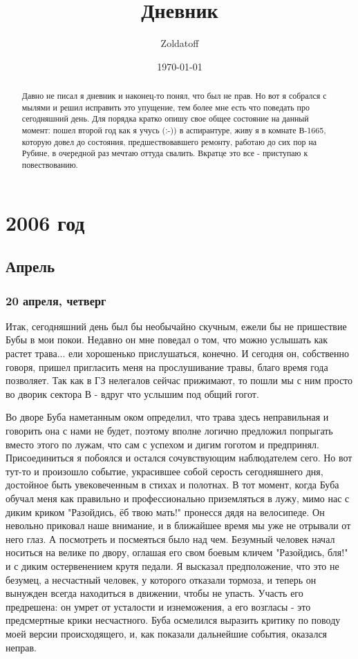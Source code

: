 \documentclass[12pt,a4paper]{article}
\newcommand{\ssubsection}[1]{
	\subsubsection*{#1}
	\addcontentsline{toc}{subsubsection}{#1}
}
\begin{document}
\author{Zoldatoff}
\title{Дневник}
\date{\today}
\maketitle
\tableofcontents
\begin{abstract}
Давно не писал я дневник и наконец-то понял, что был не прав. Но вот я собрался с мылями и решил исправить это упущение, тем более мне есть что поведать про сегодняшний день. Для порядка кратко опишу свое общее состояние на данный момент: пошел второй год как я учусь (:-)) в аспирантуре, живу я в комнате В-1665, которую довел до состояния, предшествовавшего ремонту, работаю до сих пор на Рубине, в очередной раз мечтаю оттуда свалить. Вкратце это все - приступаю к повествованию.
\end{abstract}

\section*{2006 год}

\subsection*{Апрель}

\ssubsection{20 апреля, четверг}
Итак, сегодняшний день был бы необычайно скучным, ежели бы не пришествие Бубы в мои покои. Недавно он мне поведал о том, что можно услышать как растет трава... ели хорошенько прислушаться, конечно. И сегодня он, собственно говоря, пришел пригласить меня на прослушивание травы, благо время года позволяет. Так как в ГЗ нелегалов сейчас прижимают, то пошли мы с ним просто во дворик сектора В - вдруг что услышим под общий гогот.

Во дворе Буба наметанным оком определил, что трава здесь неправильная и говорить она с нами не будет, поэтому вполне логично предложил попрыгать вместо этого по лужам, что сам с успехом и дигим гоготом и предпринял. Присоединиться я побоялся и остался сочувствующим наблюдателем сего. Но вот тут-то и произошло событие, украсившее собой серость сегодняшнего дня, достойное быть увековеченным в стихах и полотнах. В тот момент, когда Буба обучал меня как правильно и профессионально приземляться в лужу, мимо нас с диким криком "Разойдись, ёб твою мать!" пронесся дядя на велосипеде. Он невольно приковал наше внимание, и в ближайшее время мы уже не отрывали от него глаз. А посмотреть и посмеяться было над чем. Безумный человек начал носиться на велике по двору, оглашая его свом боевым кличем "Разойдись, бля!" и с диким остервенением крутя педали. Я высказал предположение, что это не безумец, а несчастный человек, у которого отказали тормоза, и теперь он вынужден всегда находиться в движении, чтобы не упасть. Участь его предрешена: он умрет от усталости и изнеможения, а его возгласы - это предсмертные крики несчастного. Буба осмелился выразить критику по поводу моей версии происходящего, и, как показали дальнейшие события, оказался неправ.
\end{document}
